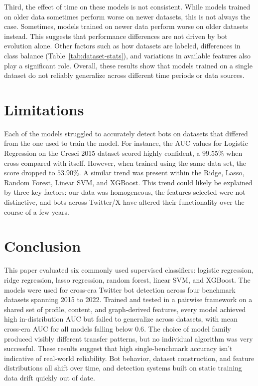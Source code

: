 Third, the effect of time on these models is not consistent. While models trained on older data sometimes perform worse on newer datasets, this is not always the case. Sometimes, models trained on newer data perform worse on older datasets instead. This suggests that performance differences are not driven by bot evolution alone. Other factors such as how datasets are labeled, differences in class balance (Table~\ref{tab:dataset-stats}), and variations in available features also play a significant role. Overall, these results show that models trained on a single dataset do not reliably generalize across different time periods or data sources.

\section{Limitations}\label{sec:limitations}
Each of the models struggled to accurately detect bots on datasets that differed from the one used to train the model. For instance, the AUC values for Logistic Regression on the Cresci 2015 dataset scored highly confident, a $99.55\%$ when cross compared with itself. However, when trained using the same data set, the score dropped to $53.90\%$. A similar trend was present within the Ridge, Lasso, Random Forest, Linear SVM, and XGBoost. This trend could likely be explained by three key factors: our data was homogeneous, the features selected were not distinctive, and bots across Twitter/X have altered their functionality over the course of a few years. 

\section{Conclusion}\label{sec:conclusion}
This paper evaluated six commonly used supervised classifiers: logistic regression, ridge regression, lasso regression, random forest, linear SVM, and XGBoost. The models were used for cross-era Twitter bot detection across four benchmark datasets spanning 2015 to 2022. Trained and tested in a pairwise framework on a shared set of profile, content, and graph-derived features, every model achieved high in-distribution AUC but failed to generalize across datasets, with mean cross-era AUC for all models falling below $0.6$. The choice of model family produced visibly different transfer patterns, but no individual algorithm was very successful. These results suggest that high single-benchmark accuracy isn’t indicative of real-world reliability. Bot behavior, dataset construction, and feature distributions all shift over time, and detection systems built on static training data drift quickly out of date. 

